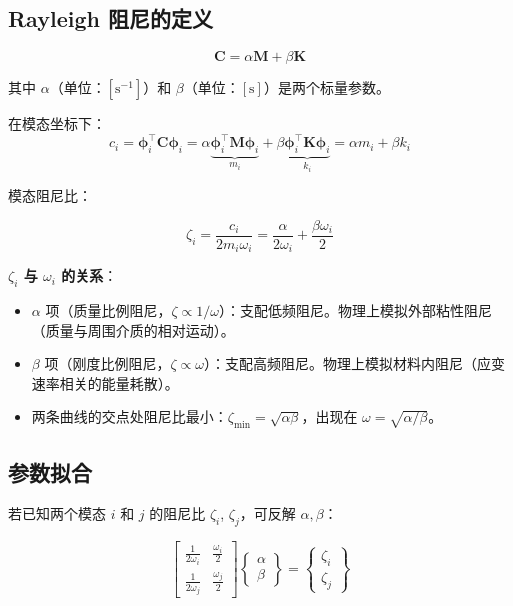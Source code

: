 \subsection{Rayleigh 阻尼的定义}

\begin{myformula}
\[
\mathbf{C} = \alpha \mathbf{M} + \beta \mathbf{K}
\]
\end{myformula}

其中 $\alpha$（单位：$[\text{s}^{-1}]$）和 $\beta$（单位：$[\text{s}]$）是两个标量参数。

在模态坐标下：
\[
c_i = \bm{\phi}_i^{\top}\mathbf{C}\bm{\phi}_i = \alpha \underbrace{\bm{\phi}_i^{\top}\mathbf{M}\bm{\phi}_i}_{m_i} + \beta \underbrace{\bm{\phi}_i^{\top}\mathbf{K}\bm{\phi}_i}_{k_i} = \alpha m_i + \beta k_i
\]

模态阻尼比：

\begin{myformula}
\[
\zeta_i = \frac{c_i}{2m_i\omega_i} = \frac{\alpha}{2\omega_i} + \frac{\beta\omega_i}{2}
\]
\end{myformula}

\textbf{$\zeta_i$ 与 $\omega_i$ 的关系}：

\begin{itemize}
\item $\alpha$ 项（质量比例阻尼，$\zeta \propto 1/\omega$）：支配低频阻尼。物理上模拟外部粘性阻尼（质量与周围介质的相对运动）。
\item $\beta$ 项（刚度比例阻尼，$\zeta \propto \omega$）：支配高频阻尼。物理上模拟材料内阻尼（应变速率相关的能量耗散）。
\item 两条曲线的交点处阻尼比最小：$\zeta_{\min} = \sqrt{\alpha\beta}$，出现在 $\omega = \sqrt{\alpha/\beta}$。
\end{itemize}

\subsection{参数拟合}

若已知两个模态 $i$ 和 $j$ 的阻尼比 $\zeta_i$, $\zeta_j$，可反解 $\alpha, \beta$：

\[
\begin{bmatrix} \frac{1}{2\omega_i} & \frac{\omega_i}{2} \\[4pt] \frac{1}{2\omega_j} & \frac{\omega_j}{2} \end{bmatrix}
\begin{Bmatrix} \alpha \\ \beta \end{Bmatrix} = 
\begin{Bmatrix} \zeta_i \\ \zeta_j \end{Bmatrix}
\]

